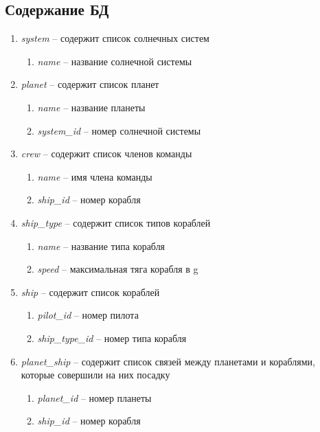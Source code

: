 \subsection{Содержание БД}
\begin{enumerate}

\item {\it system} -- содержит список солнечных систем
\begin{enumerate}
\item {\it name} -- название солнечной системы
\end{enumerate}

\item {\it planet} -- содержит список планет
\begin{enumerate}
\item {\it name} -- название планеты
\item {\it system\_id} -- номер солнечной системы
\end{enumerate}

\item {\it crew} -- содержит список членов команды
\begin{enumerate}
\item {\it name} -- имя члена команды
\item {\it ship\_id} -- номер корабля
\end{enumerate}

\item {\it ship\_type} -- содержит список типов кораблей
\begin{enumerate}
\item {\it name} -- название типа корабля
\item {\it speed} -- максимальная тяга корабля в g
\end{enumerate}

\item {\it ship} -- содержит список кораблей
\begin{enumerate}
\item {\it pilot\_id} -- номер пилота
\item {\it ship\_type\_id} -- номер типа корабля
\end{enumerate}

\item {\it planet\_ship} -- содержит список связей между планетами и кораблями, которые совершили на них посадку
\begin{enumerate}
\item {\it planet\_id} -- номер планеты
\item {\it ship\_id} -- номер корабля
\end{enumerate}


\end{enumerate}
